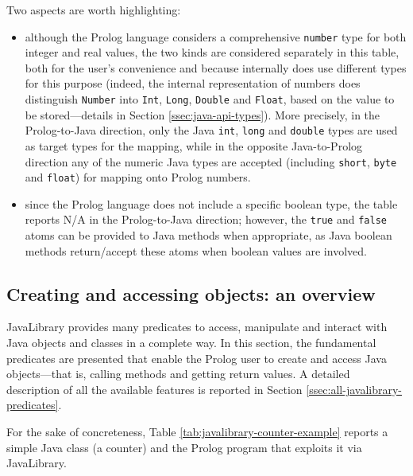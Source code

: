 \noindent Two aspects are worth highlighting:
\begin{itemize}
  \item although the Prolog language considers a comprehensive \texttt{number} type for both integer and real values, the two kinds are considered separately in this table, both for the user's convenience and because \tuprolog{} internally does use different types for this purpose (indeed, the \tuprolog{} internal representation of numbers does distinguish \texttt{Number} into \texttt{Int}, \texttt{Long}, \texttt{Double} and \texttt{Float}, based on the value to be stored---details in Section \ref{ssec:java-api-types}).
      More precisely, in the Prolog-to-Java direction, only the Java \texttt{int}, \texttt{long} and \texttt{double} types are used as target types for the mapping, while in the opposite Java-to-Prolog direction any of the numeric Java types are accepted (including \texttt{short}, \texttt{byte} and \texttt{float}) for mapping onto Prolog numbers.
  \item since the Prolog language does not include a specific boolean type, the table reports N/A in the Prolog-to-Java direction; however, the \texttt{true} and \texttt{false} atoms can be provided to Java methods when appropriate, as Java boolean methods return/accept these atoms when boolean values are involved.
\end{itemize}

\subsection{Creating and accessing objects: an overview}
\label{ssec:creating-and-accessing-objects}

JavaLibrary provides many predicates to access, manipulate and interact with Java objects and classes in a complete way.
In this section, the fundamental predicates are presented that enable the Prolog user to create and access Java objects---that is, calling methods and getting return values.
A detailed description of all the available features is reported in Section \ref{ssec:all-javalibrary-predicates}.

For the sake of concreteness, Table \ref{tab:javalibrary-counter-example} reports a simple Java class (a counter) and the Prolog program that exploits it via JavaLibrary.

